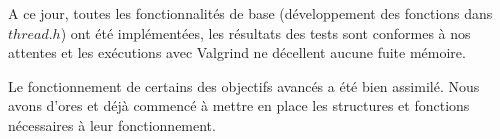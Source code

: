A ce jour, toutes les fonctionnalités de base (développement des fonctions dans $thread.h$) ont été implémentées, les résultats des tests sont conformes à nos attentes et les exécutions avec Valgrind ne décellent aucune fuite mémoire.

Le fonctionnement de certains des objectifs avancés a été bien assimilé. Nous avons d'ores et déjà commencé à mettre en place les structures et fonctions nécessaires à leur fonctionnement. 
